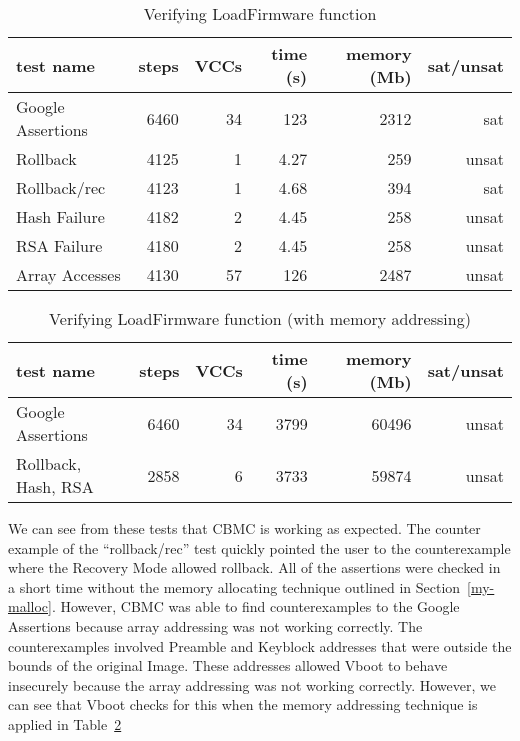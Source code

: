 \begin{table}[!htbp]
    \centering
    \caption{Verifying LoadFirmware function}\label{ldfw_results}
    \begin{tabular}{lrrrrr}
        \toprule
        test name & steps & VCCs  & time (s) & memory (Mb) & sat/unsat  \\ \midrule
        Google Assertions & 6460 & 34 & 123 & 2312 & sat \\
        Rollback     & 4125 & 1 & 4.27 & 259 & unsat \\
        Rollback/rec & 4123 & 1 & 4.68 & 394 & sat \\
        Hash Failure & 4182 & 2 & 4.45 & 258 & unsat \\
        RSA  Failure & 4180 & 2 & 4.45 & 258 & unsat \\
        Array Accesses & 4130 & 57 & 126 & 2487 & unsat \\\bottomrule
    \end{tabular}
\end{table}

\begin{table}[!htbp]
    \centering
    \caption{Verifying LoadFirmware function (with memory addressing)}\label{ldfw_results_malloc}
    \begin{tabular}{lrrrrr}
        \toprule
        test name & steps & VCCs  & time (s) & memory (Mb) & sat/unsat  \\ \midrule
        Google Assertions & 6460 & 34 & 3799 & 60496 & unsat \\
        Rollback, Hash, RSA & 2858 & 6 & 3733 & 59874 & unsat \\\bottomrule
    \end{tabular}
\end{table}

We can see from these tests that CBMC is working as expected.
The counter example of the ``rollback/rec'' test quickly pointed the user to the counterexample where the Recovery Mode allowed rollback.
All of the assertions were checked in a short time without the memory allocating technique outlined in Section~\ref{my-malloc}. 
However, CBMC was able to find counterexamples to the Google Assertions because array addressing was not working correctly.
The counterexamples involved Preamble and Keyblock addresses that were outside the bounds of the original Image.
These addresses allowed Vboot to behave insecurely because the array addressing was not working correctly.
However, we can see that Vboot checks for this when the memory addressing technique is applied in Table~\ref{ldfw_results_malloc}

